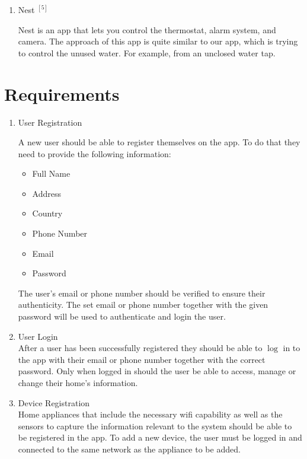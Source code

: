 \documentclass[10pt]{article}
\begin{document}
\begin{enumerate}
  \item {Nest ${ }^{[5]}$}
  
  Nest is an app that lets you control the thermostat, alarm system, and camera. The approach of this app is quite similar to our app, which is trying to control the unused water. For example, from an unclosed water tap.

\end{enumerate}


\section{Requirements}

\begin{enumerate}
  \item {User Registration}
  
  A new user should be able to register themselves on the app. To do that they need to provide the following information:

  \begin{itemize}
    \item Full Name
  
    \item Address
  
    \item Country
  
    \item Phone Number
  
    \item Email
  
    \item Password
  
  \end{itemize}

  The user's email or phone number should be verified to ensure their authenticity. The set email or phone number together with the given password will be used to authenticate and login the user.

  \item {User Login}\\
  After a user has been successfully registered they should be able to $\log$ in to the app with their email or phone number together with the correct password. Only when logged in should the user be able to access, manage or change their home's information.

  \item {Device Registration} \\
  Home appliances that include the necessary wifi capability as well as the sensors to capture the information relevant to the system should be able to be registered in the app. To add a new device, the user must be logged in and connected to the same network as the appliance to be added.
  

\end{enumerate}
\end{document}
